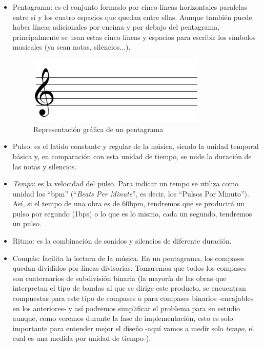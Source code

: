 \begin{itemize}
  \item Pentagrama: es el conjunto formado por cinco líneas horizontales paralelas entre sí y los cuatro espacios que quedan entre ellas.
  Aunque también puede haber líneas adicionales por encima y por debajo del pentagrama, principalmente se usan estas cinco
  líneas y espacios para escribir los símbolos musicales (ya sean notas, silencios...).
    \begin{figure}[htb]
    \centering
    \includegraphics[width=0.8\textwidth]{./imagenes/pentagrama}
    \caption{Representación gráfica de un pentagrama} \label{fig:pentagrama}
    \end{figure}
  \item Pulso: es el latido constante y regular de la música, siendo la unidad temporal básica y, en comparación con
  esta unidad de tiempo, se mide la duración de las notas y silencios.
  \item \textit{Tempo}: es la velocidad del pulso. Para indicar un tempo se utiliza como unidad los “bpm”
    (“\textit{Beats Per Minute}”, es decir, los “Pulsos Por Minuto”). Así, si el tempo de una obra es de 60bpm,
    tendremos que se producirá un pulso por segundo (1bps) o lo que es lo mismo, cada un segundo, tendremos un pulso.
  \item Ritmo: es la combinación de sonidos y silencios de diferente duración.
  \item Compás: facilita la lectura de la música. En un pentagrama, los compases quedan divididos por líneas divisorias.
    Tomaremos que todos los compases son cuaternarios de subdivisión binaria (la mayoría de las obras que interpretan
    el tipo de bandas al que se dirige este producto, se
    encuentran compuestas para este tipo de compases o para compases binarios -encajables en los anteriores- y así podremos simplificar el
    problema para su estudio aunque, como veremos durante la fase de implementación, esto es solo importante para entender mejor
    el diseño -aquí vamos a medir solo \textit{tempo}, el cual es una medida por unidad de tiempo-).
  \end{itemize}

